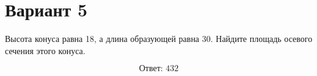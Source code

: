 \documentclass[12pt,a4paper]{article}
\begin{document}
\section*{Вариант 5}

Высота конуса равна 18, а длина образующей равна 30. Найдите площадь осевого сечения этого конуса.

\begin{center}
\end{center}

\[
\boxed{\text{Ответ: }432}
\]
\end{document}
